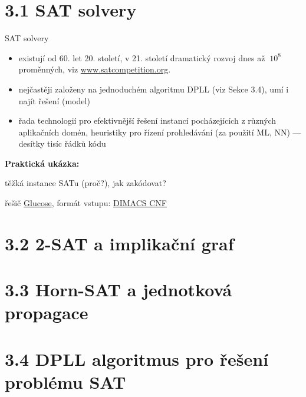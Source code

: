 \documentclass{beamer}
\begin{document}
\section{3.1 SAT solvery}


\begin{frame}{SAT solvery}

    \begin{itemize}
        \item existují od 60. let 20. století, v 21. století dramatický rozvoj dnes až $~10^8$ proměnných, viz \href{http://www.satcompetition.org}{\alert{www.satcompetition.org}}.
        \item nejčastěji založeny na jednoduchém \alert{algoritmu DPLL} (viz Sekce 3.4), umí i najít řešení (model)
        \item řada technologií pro efektivnější řešení instancí pocházejících z různých aplikačních domén, heuristiky pro řízení prohledávání (za použití ML, NN) --- desítky tisíc řádků kódu
    \end{itemize}
    
    \textbf{Praktická ukázka:}


    \vspace{-6pt}
    těžká instance SATu (proč?), jak zakódovat? 
    
    řešič \href{http://www.labri.fr/perso/lsimon/glucose/}{\alert{Glucose}}, formát vstupu: \href{http://people.sc.fsu.edu/~jburkardt/data/cnf/cnf.html}{\alert{DIMACS CNF}}
    
\end{frame}


\section{3.2 2-SAT a implikační graf}


\section{3.3 Horn-SAT a jednotková propagace}


\section{3.4 DPLL algoritmus pro řešení problému SAT}
\end{document}
